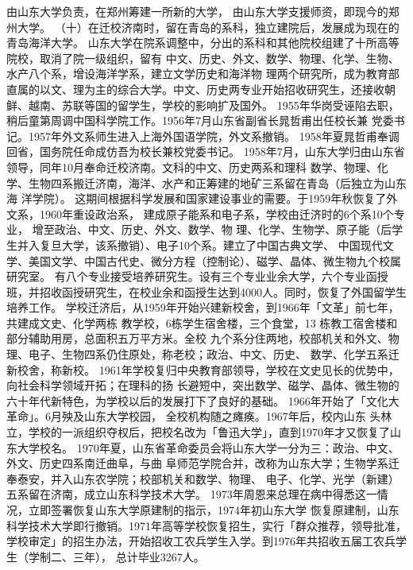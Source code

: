 \documentclass{sduthesis}
\begin{document}
由山东大学负责，在郑州筹建一所新的大学， 由山东大学支援师资，即现今的郑州大学。 （十）在迁校济南时，留在青岛的系科，独立建院后，发展成为现在的青岛海洋大学。 山东大学在院系调整中，分出的系科和其他院校组建了十所高等院校，取消了院一级组织，留有 中文、历史、外文、数学、物理、化学、生物、水产八个系，增设海洋学系，建立文学历史和海洋物 理两个研究所，成为教育部直属的以文、理为主的综合大学。中文、历史两专业开始招收研究生，还接收朝鲜、越南、苏联等国的留学生，学校的影响扩及国外。 1955年华岗受诬陷去职，稍后童第周调中国科学院工作。1956年7月山东省副省长晁哲甫出任校长兼 党委书记。1957年外文系师生进入上海外国语学院，外文系撤销。 1958年夏晁哲甫奉调回省，国务院任命成仿吾为校长兼校党委书记。 1958年7月，山东大学归由山东省领导，同年10月奉命迁校济南。文科的中文、历史两系和理科 数学、物理、化学、生物四系搬迁济南，海洋、水产和正筹建的地矿三系留在青岛（后独立为山东海 洋学院）。 这期间根据科学发展和国家建设事业的需要。于1959年秋恢复了外文系，1960年重设政治系， 建成原子能系和电子系，学校由迁济时的6个系10个专业， 增至政治、中文、历史、外文、数学、物 理、化学、生物学、原子能（后学生并入复旦大学，该系撤销）、电子10个系。建立了中国古典文学、 中国现代文学、美国文学、中国古代史、微分方程（控制论）、磁学、晶体、微生物九个校属研究室。 有八个专业接受培养研究生。设有三个专业业余大学，六个专业函授班，并招收函授研究生，在校业余和函授生达到4000人。同时，恢复了外国留学生培养工作。 学校迁济后，从1959年开始兴建新校舍，到1966年「文革」前七年，共建成文史、化学两栋 教学校，6栋学生宿舍楼，三个食堂，13 栋教工宿舍楼和部分辅助用房，总面积五万平方米。全校 九个系分住两地，校部机关和外文、物理、电子、生物四系仍住原处，称老校；政治、中文、历史、 数学、化学五系迁新校舍，称新校。 1961年学校复归中央教育部领导，学校在文史见长的优势中，向社会科学领域开拓；在理科的扬 长避短中，突出数学、磁学、晶体、微生物的六十年代新特色，为学校以后的发展打下了良好的基础。 1966年开始了「文化大革命」。6月殃及山东大学校园， 全校机构随之瘫痪。1967年后，校内山东 头林立，学校的一派组织夺权后，把校名改为「鲁迅大学」，直到1970年才又恢复了山东大学校名。 1970年夏，山东省革命委员会将山东大学一分为三：政治、中文、外文、历史四系南迁曲阜，与曲 阜师范学院合并，改称为山东大学；生物学系迁奉泰安，并入山东农学院；校部机关和数学、物理、 电子、化学、光学（新建）五系留在济南，成立山东科学技术大学。 1973年周恩来总理在病中得悉这一情况，立即签署恢复山东大学原建制的指示，1974年初山东大学 恢复原建制，山东科学技术大学即行撤销。1971年高等学校恢复招生，实行「群众推荐，领导批准， 学校审定」的招生办法，开始招收工农兵学生入学。到1976年共招收五届工农兵学生（学制二、三年）， 总计毕业3267人。
\end{document}
